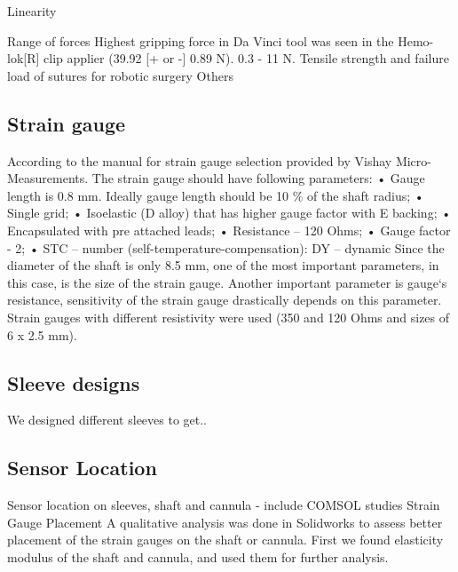 Linearity

Range of forces 
Highest gripping force in Da Vinci tool was seen in the Hemo-lok[R] clip applier (39.92 [+ or -] 0.89 N).
0.3 - 11 N. 
Tensile strength and failure load of sutures for robotic surgery
Others

\subsection{Strain gauge}
\label{sec:SGReq}
According to the manual for strain gauge selection provided by Vishay Micro-Measurements. The strain gauge should have following parameters:
• Gauge length is 0.8 mm. Ideally gauge length should be 10 \% of the shaft radius;
• Single grid;
• Isoelastic (D alloy) that has higher gauge factor with E backing;
• Encapsulated with pre attached leads;
• Resistance – 120 Ohms;
• Gauge factor - 2;
• STC – number (self-temperature-compensation): DY – dynamic
Since the diameter of the shaft is only 8.5 mm, one of the most important parameters, in this
case, is the size of the strain gauge. Another important parameter is gauge‘s resistance, sensitivity
of the strain gauge drastically depends on this parameter. Strain gauges with different resistivity
were used (350 and 120 Ohms and sizes of 6 x 2.5 mm).

\subsection{Sleeve designs}
\label{sec:SlevDes}
We designed different sleeves to get..

\subsection{Sensor Location}
\label{sec:SenLoc}
Sensor location on sleeves, shaft and cannula - include COMSOL studies
Strain Gauge Placement
A qualitative analysis was done in Solidworks to assess better placement of the strain gauges on the shaft or cannula. First we found elasticity modulus of the shaft and cannula, and used them for further analysis.


